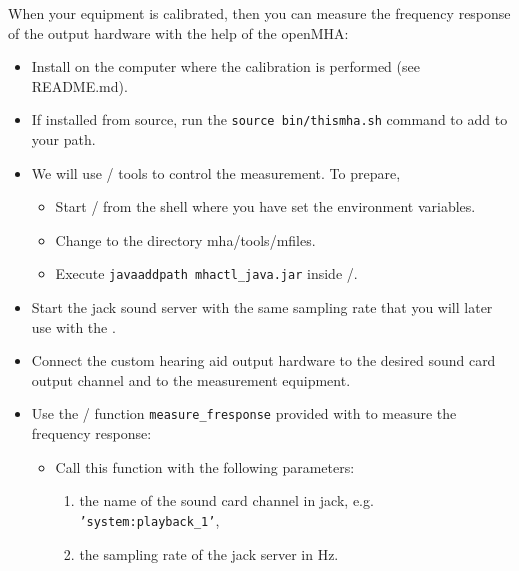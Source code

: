 \documentclass[11pt,a4paper,twoside]{article}
\newcommand{\+}{\discretionary{\mbox{\scriptsize$\hookleftarrow$}}{}{}}
\begin{document}
%

When your equipment is calibrated, then you can measure the frequency
response of the output hardware with the help of the openMHA:

\begin{itemize}
\item
  Install \mha{} on the computer where the calibration is performed (see README.md).
\item
  If installed from source, run the \texttt{source bin/thismha.sh}
  command to add \mha{} to your path.
\item
  We will use \Octave{}/\Matlab{} tools to control the measurement. To
  prepare,
  \begin{itemize}
  \item Start \Octave{}/\Matlab{} from the shell where you have set
    the \mha{} environment variables.
  \item Change to the directory mha/tools/mfiles.
  \item Execute \texttt{javaaddpath mhactl\_java.jar} inside
    \Octave{}/\Matlab{}.
  \end{itemize}
\item
  Start the jack sound server with the same sampling rate that you
  will later use with the \mha{}.
\item
  Connect the custom hearing aid output hardware to the desired
  sound card output channel and to the measurement equipment.
\item
  Use the \Octave{}/\Matlab{} function \texttt{measure\_fresponse}
  provided with \mha{} to measure the frequency response:
  \begin{itemize}
  \item Call this function with the following parameters:
    \begin{enumerate}
    \item the name of the sound card channel in jack,
      e.g. \texttt{'system:playback\_1'},
    \item the sampling rate of the jack server in Hz.

\end{enumerate}
\end{itemize}
\end{itemize}
\end{document}
